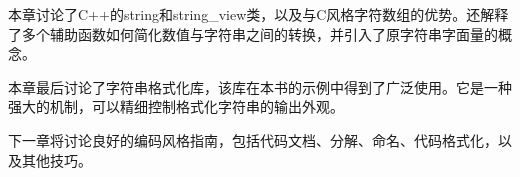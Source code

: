本章讨论了C++的string和string\_view类，以及与C风格字符数组的优势。还解释了多个辅助函数如何简化数值与字符串之间的转换，并引入了原字符串字面量的概念。

本章最后讨论了字符串格式化库，该库在本书的示例中得到了广泛使用。它是一种强大的机制，可以精细控制格式化字符串的输出外观。

下一章将讨论良好的编码风格指南，包括代码文档、分解、命名、代码格式化，以及其他技巧。

